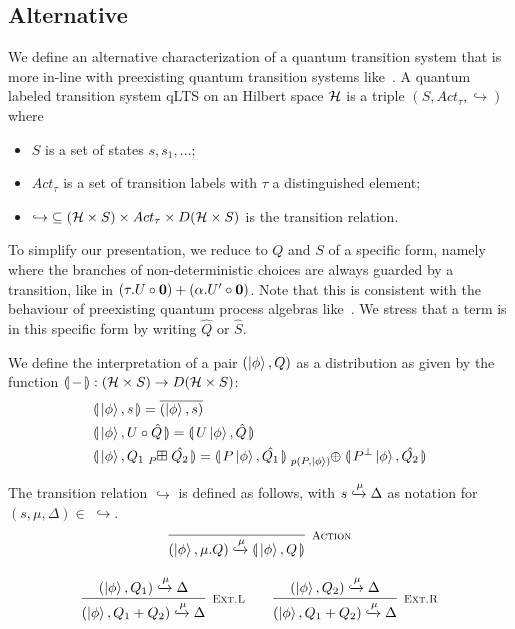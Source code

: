 \subsection{Alternative}
We define an alternative characterization of a quantum transition system that is more in-line with preexisting quantum transition systems like~\cite{Feng:2012, Deng:2012}.
A quantum labeled transition system qLTS on an Hilbert space $\mathcal{H}$ is a triple $(S, Act_\tau, \hookrightarrow)$ where
\begin{itemize}
	\item $S$ is a set of states $s, s_1, \dots$;
	\item $Act_\tau$ is a set of transition labels with $\tau$ a distinguished element;
  \item $\hookrightarrow\;\subseteq (\mathcal{H} \times S) \times Act_\tau \times D(\mathcal{H} \times S)$ is the transition relation. 
\end{itemize}

To simplify our presentation, we reduce to $Q$ and $S$ of a specific form, namely where the branches of non-deterministic choices are always guarded by a transition, like in $(\tau. U \circ \mathbf{0}) + (\alpha . U' \circ \mathbf{0})$.
Note that this is consistent with the behaviour of preexisting quantum process algebras like~\cite{Feng:2012, Deng:2012}.
We stress that a term is in this specific form by writing $\hat{Q}$ or $\hat{S}$.

We define the interpretation of a pair $(\ket{\phi}, Q)$ as a distribution as given by the function $\llparenthesis\,{-}\,\rrparenthesis : (\mathcal{H} \times S) \to D(\mathcal{H} \times S)$:
\begin{align*}
	&\sema{\ket{\phi}, s} = \overline{(\ket{\phi}, s)} \\
	&\sema{\ket{\phi}, U \circ \hat{Q}} = \sema{U\ket{\phi}, \hat{Q}} \\
	&\sema{\ket{\phi}, Q_1 \qsum{P} \hat{Q_2} } = \sema{P \ket{\phi}, \hat{Q_1}} \psum{p(P, \ket{\phi})} \sema{P^{\bot}\ket{\phi}, \hat{Q_2}} 
\end{align*}

The transition relation $\hookrightarrow$ is defined as follows, with $s \xhookrightarrow{\mu} \Delta$ as notation for $(s, \mu, \Delta) \in\;\hookrightarrow$.
\begin{gather*}
  \infer[\mbox{\footnotesize\scshape Action}]{(\ket{\phi}, \mu.Q) \xhookrightarrow{\mu} \sema{\ket{\phi}, Q}}{} \\[0.3cm]
  \infer[\mbox{\footnotesize\scshape Ext.L}]{(\ket{\phi}, Q_1 + Q_2) \xhookrightarrow{\mu} \Delta}{(\ket{\phi}, Q_1) \xhookrightarrow{\mu} \Delta} \qquad
  \infer[\mbox{\footnotesize\scshape Ext.R}]{(\ket{\phi}, Q_1 + Q_2) \xhookrightarrow{\mu} \Delta}{(\ket{\phi}, Q_2) \xhookrightarrow{\mu} \Delta}
\end{gather*}

